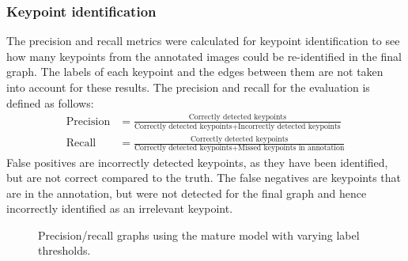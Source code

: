 \subsubsection{Keypoint identification}
The precision and recall metrics were calculated for keypoint identification to see how many keypoints from the annotated images could be re-identified in the final graph. The labels of each keypoint and the edges between them are not taken into account for these results. The precision and recall for the evaluation is defined as follows:
\begin{align}
\text{Precision} &= \frac{\text{Correctly detected keypoints}}{\text{Correctly detected keypoints} + \text{Incorrectly detected keypoints}} 
\\[10pt]
\text{Recall} &= \frac{\text{Correctly detected keypoints}}{\text{Correctly detected keypoints} + \text{Missed keypoints in annotation}}
\end{align}
False positives are incorrectly detected keypoints, as they have been identified, but are not correct compared to the truth. The false negatives are keypoints that are in the annotation, but were not detected for the final graph and hence incorrectly identified as an irrelevant keypoint.
\newcommand{\pridentplot}[5]{
\addplot+[mark=none, fill opacity=0.2, 
	discard if not={Method}{#1}, 
	discard if not={Model}{#2}, 
	discard if not={Category}{#3},
	discard if not={HistThreshold}{#4}
] table [x=Recall, y=Precision, col sep=comma] {\resultspath/kp-identification.csv};
\addlegendentry{#5}
}
\newcommand{\pridentgraph}[3]{
\begin{tikzpicture}[scale=0.8]
\begin{axis}[
	title = {\textbf{Histogram threshold of #2}},
	legend pos=south east,
	enlargelimits=true,
	xlabel={Recall},
	xmin=0,xmax=1,
	ylabel={Precision},
	ymin=0,ymax=1
]

\pridentplot{graph}{#1}{mature}{#2}{Graph method, mature lobsters}
\pridentplot{model}{#1}{mature}{#2}{Label method, mature lobsters}
\pridentplot{graph}{#1}{juvenile}{#2}{Graph method, juvenile lobsters}
\pridentplot{model}{#1}{juvenile}{#2}{Label method, juvenile lobsters}

\end{axis}
\end{tikzpicture}
}


\begin{figure}[H]
\centering
{}
\caption{Precision/recall graphs using the mature model with varying label thresholds.}
\label{fig:pridentmat}
\end{figure}

